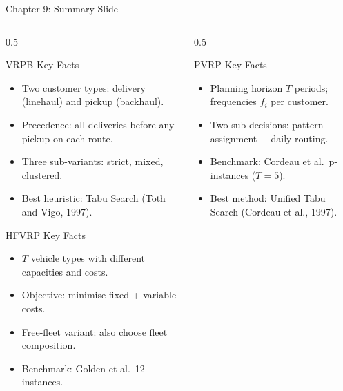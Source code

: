 \documentclass[aspectratio=169,10pt]{beamer}
\begin{document}
\begin{frame}[allowframebreaks]{Chapter 9: Summary Slide}

\begin{columns}[T]
  \begin{column}{0.5\textwidth}
    \begin{block}{VRPB Key Facts}
      \begin{itemize}\small
        \item Two customer types: delivery (linehaul) and pickup (backhaul).
        \item Precedence: all deliveries before any pickup on each route.
        \item Three sub-variants: strict, mixed, clustered.
        \item Best heuristic: Tabu Search (Toth and Vigo, 1997).
      \end{itemize}
    \end{block}
    \vspace{0.3em}
    \begin{block}{HFVRP Key Facts}
      \begin{itemize}\small
        \item $T$ vehicle types with different capacities and costs.
        \item Objective: minimise fixed + variable costs.
        \item Free-fleet variant: also choose fleet composition.
        \item Benchmark: Golden et al.\ 12 instances.
      \end{itemize}
    \end{block}
  \end{column}
  \begin{column}{0.5\textwidth}
    \begin{block}{PVRP Key Facts}
      \begin{itemize}\small
        \item Planning horizon $T$ periods; frequencies $f_i$ per customer.
        \item Two sub-decisions: pattern assignment + daily routing.
        \item Benchmark: Cordeau et al.\ p-instances ($T=5$).
        \item Best method: Unified Tabu Search (Cordeau et al., 1997).
      \end{itemize}
    \end{block}
    \vspace{0.3em}

\end{column}
\end{columns}
\end{frame}
\end{document}
